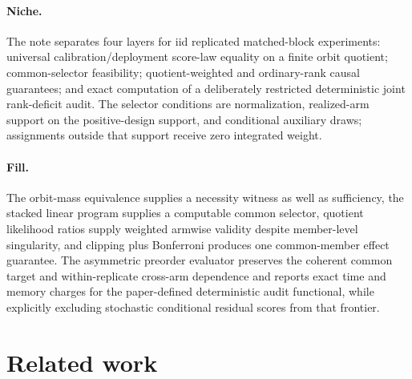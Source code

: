 \documentclass{article}
\begin{document}
\paragraph{Niche.} The note separates four layers for iid replicated matched-block experiments: universal calibration/deployment score-law equality on a finite orbit quotient; common-selector feasibility; quotient-weighted and ordinary-rank causal guarantees; and exact computation of a deliberately restricted deterministic joint rank-deficit audit. The selector conditions are normalization, realized-arm support on the positive-design support, and conditional auxiliary draws; assignments outside that support receive zero integrated weight.

\paragraph{Fill.} The orbit-mass equivalence supplies a necessity witness as well as sufficiency, the stacked linear program supplies a computable common selector, quotient likelihood ratios supply weighted armwise validity despite member-level singularity, and clipping plus Bonferroni produces one common-member effect guarantee. The asymmetric preorder evaluator preserves the coherent common target and within-replicate cross-arm dependence and reports exact time and memory charges for the paper-defined deterministic audit functional, while explicitly excluding stochastic conditional residual scores from that frontier.

\section{Related work}
\end{document}

